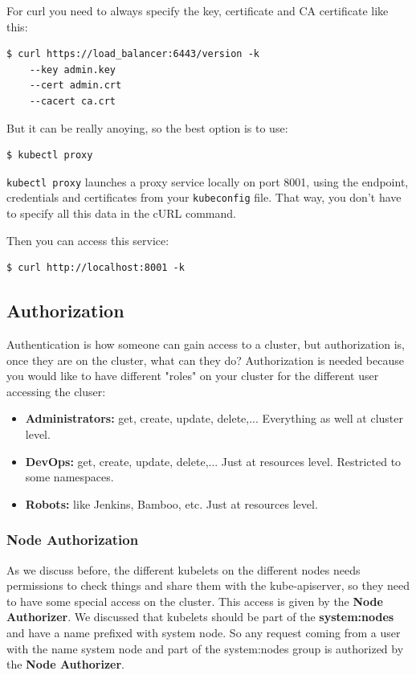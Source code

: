 \documentclass{article}
\newenvironment{codetemplate}[1][]{%
  \mybasecolorbox[#1]
  \itshape
}{%
  \endmybasecolorbox
}
\begin{document}
For curl you need to always specify the key, certificate and CA certificate like this:
\begin{codetemplate}{}
\begin{verbatim}
$ curl https://load_balancer:6443/version -k
    --key admin.key
    --cert admin.crt
    --cacert ca.crt
\end{verbatim}
\end{codetemplate}

But it can be really anoying, so the best option is to use:
\begin{codetemplate}{}
\begin{verbatim}
$ kubectl proxy
\end{verbatim}
\end{codetemplate}

\verb|kubectl proxy| launches a proxy service locally on port 8001, using the endpoint, credentials and certificates
from your \verb|kubeconfig| file. That way, you don't have to specify all this data in the cURL command.

Then you can access this service:
\begin{codetemplate}{}
\begin{verbatim}
$ curl http://localhost:8001 -k
\end{verbatim}
\end{codetemplate}

\subsection{Authorization}
Authentication is how someone can gain access to a cluster, but authorization is, once they are on the cluster, what can they do? Authorization is needed because you would like to have different "roles" on your cluster for the different
user accessing the cluser: 
\begin{itemize}
    \item \textbf{Administrators:} get, create, update, delete,... Everything as well at cluster level.
    \item \textbf{DevOps:} get, create, update, delete,... Just at resources level. Restricted to some namespaces.
    \item \textbf{Robots:} like Jenkins, Bamboo, etc. Just at resources level.
\end{itemize}

\subsubsection{Node Authorization}
As we discuss before, the different kubelets on the different nodes needs permissions to check things and
share them with the kube-apiserver, so they need to have some special access on the cluster. This access is given by the \textbf{Node Authorizer}. We discussed
that kubelets should be part of the \textbf{system:nodes} and have a name prefixed with system node.
So any request coming from a user with the name system node and part of the system:nodes group is authorized by the \textbf{Node Authorizer}.
\end{document}

